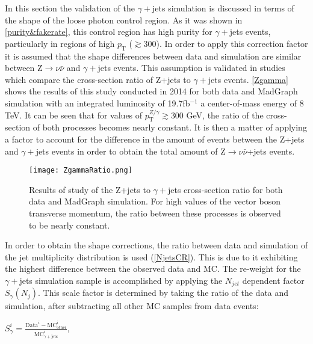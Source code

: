 In this section the validation of the $\gamma+$jets simulation is discussed in terms of the shape of the loose photon control region. As it was shown in \autoref{purity&fakerate}, this control region has high purity for $\gamma+$jets events, particularly in regions of high $p_\text{T}$ ($\gtrsim 300$). In order to apply this correction factor it is assumed that the shape differences between data and simulation are similar between Z$\rightarrow\nu\bar{\nu}$ and $\gamma+$jets events. This assumption is validated in studies which compare the cross-section ratio of Z+jets to $\gamma+$jets events\cite{ZtoGamma}. \autoref{Zgamma} shows the results of this study conducted in 2014 for both data and MadGraph simulation with an integrated luminosity of 19.7fb$^{-1}$ a center-of-mass energy of 8 TeV. It can be seen that for values of $p_\text{T}^{Z/\gamma} \gtrsim 300$ GeV, the ratio of the cross-section of both processes becomes nearly constant. It is then a matter of applying a factor to account for the difference in the amount of events between the Z+jets and $\gamma+$jets events in order to obtain the total amount of Z$\rightarrow\nu\bar{\nu}$+jets events.

\begin{figure}[H]
\begin{center}
\texttt{[image: ZgammaRatio.png]}
\end{center}
\vspace{-1em}
\caption{Results of study of the Z+jets to $\gamma+$jets cross-section ratio for both data and MadGraph simulation. For high values of the vector boson transverse momentum, the ratio between these processes is observed to be nearly constant.}
\label{Zgamma}
\end{figure}

\vspace{1em}

In order to obtain the shape corrections, the ratio between data and simulation of the jet multiplicity distribution is used (\autoref{NjetsCR}). This is due to it exhibiting the highest difference between the observed data and MC. The re-weight for the $\gamma+$jets simulation sample is accomplished by applying the $N_{jet}$ dependent factor $S_\gamma(N_j)$. This scale factor is determined by taking the ratio of the data and simulation, after subtracting all other MC samples from data events:

\begingroup
	\Large
	\begin{center}
		$S^{i}_{\gamma} = \frac{\text{Data}^{i} - \text{M}\text{C}^{i}_\text{other}}{\text{M}\text{C}_{\gamma+\text{jets}}^i}$,
	\end{center}
\endgroup

